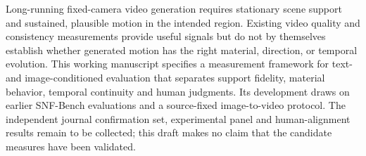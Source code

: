Long-running fixed-camera video generation requires stationary scene support and sustained, plausible motion in the intended region. Existing video quality and consistency measurements provide useful signals but do not by themselves establish whether generated motion has the right material, direction, or temporal evolution. This working manuscript specifies a measurement framework for text- and image-conditioned evaluation that separates support fidelity, material behavior, temporal continuity and human judgments. Its development draws on earlier SNF-Bench evaluations and a source-fixed image-to-video protocol. The independent journal confirmation set, experimental panel and human-alignment results remain to be collected; this draft makes no claim that the candidate measures have been validated.
